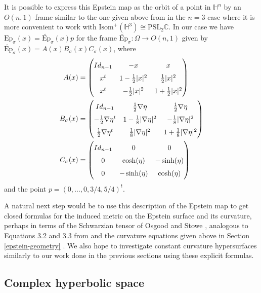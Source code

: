 \documentclass{amsart}
\newcommand{\C}{\mathbb{C}}
\renewcommand{\H}{\mathbb{H}}
\begin{document}
It is possible to express this Epstein map as the orbit of a point in $\H^n$ by an $O(n,1)$-frame similar to the one given above from \cite{dumas2017} in the $n=3$ case where it is more convenient to work with $\mathrm{Isom}^+(\H^3) \cong \mathrm{PSL}_2\C$.
In our case we have $\mathrm{Ep}_\sigma(x) = \widetilde{\mathrm{Ep}}_\sigma(x)p$ for the frame $\widetilde{\mathrm{Ep}}_\sigma: \Omega \to O(n,1)$ given by $\widetilde{\mathrm{Ep}}_\sigma(x) = A(x) B_\sigma(x) C_\sigma(x)$, where 
\begin{align*}
A(x) &= \def\arraystretch{1.5}\begin{pmatrix}
Id_{n-1} & -x & x \\
x^t & 1- \frac{1}{2}|x|^2 & \frac{1}{2} |x|^2 \\
x^t & -\frac{1}{2}|x|^2 & 1 + \frac{1}{2} |x|^2
\end{pmatrix} \\ 
B_\sigma(x) &= 
\def\arraystretch{1.5}
\begin{pmatrix}
Id_{n-1} & \frac{1}{2} \nabla\eta  & \frac{1}{2}\nabla\eta \\
-\frac{1}{2} \nabla\eta^t & 1-\frac{1}{8} |\nabla\eta|^2 & -\frac{1}{8} |\nabla\eta|^2 \\
\frac{1}{2}\nabla\eta^t & \frac{1}{8} |\nabla\eta|^2 & 1 + \frac{1}{8} |\nabla\eta|^2 
\end{pmatrix} \\
C_\sigma(x) &= 
\def\arraystretch{1.5}
\begin{pmatrix}
Id_{n-1} & 0 & 0 \\
0 & \cosh(\eta) & -\sinh(\eta) \\
0 & -\sinh(\eta) & \cosh(\eta) 
\end{pmatrix}
\end{align*}
and the point $p = (0, \ldots, 0 , 3/4,5/4)^t$.

A natural next step would be to use this description of the Epstein map to get closed formulas for the induced metric on the Epstein surface and its curvature, perhaps in terms of the Schwarzian tensor of Osgood and Stowe \cite{osgood-stowe1992}, analogous to Equations 3.2 and 3.3 from \cite{dumas2017} and the curvature equations given above in Section \ref{epstein-geometry} .
We also hope to investigate constant curvature hypersurfaces similarly to our work done in the previous sections using these explicit formulas. 



\subsection{Complex hyperbolic space}
\end{document}

